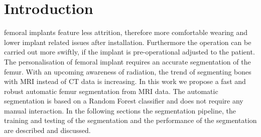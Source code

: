 \section{Introduction}
 femoral implants feature less attrition, therefore more comfortable wearing and lower implant related issues after installation. Furthermore the operation can be carried out more swiftly, if the implant is pre-operational adjusted to the patient. The personalisation of femoral implant requires an accurate segmentation of the femur. With an upcoming awareness of radiation, the trend of segmenting bones with MRI instead of CT data is increasing.
In this work we propose a fast and robust automatic femur segmentation from MRI data. The automatic segmentation is based on a Random Forest classifier and does not require any manual interaction. In the following sections the segmentation pipeline, the training and testing of the segmentation and the performance of the segmentation are described and discussed.

